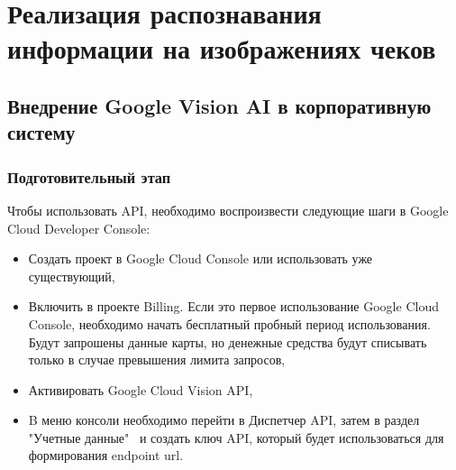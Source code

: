 \documentclass[14pt]{mmcs_article}
\begin{document}

\section{Реализация распознавания информации на изображениях чеков}

\subsection{Внедрение Google Vision AI в корпоративную систему}
\subsubsection{Подготовительный этап}
Чтобы использовать API, необходимо воспроизвести следующие шаги в Google Cloud Developer Console:
\begin{itemize}
\item Создать проект в Google Cloud Console или использовать уже существующий,
\item Включить в проекте Billing. Если это первое использование Google Cloud Console, необходимо начать бесплатный пробный период использования. Будут запрошены данные карты, но денежные средства будут списывать только в случае превышения лимита запросов,
\item Активировать Google Cloud Vision API,
\item B меню консоли необходимо перейти в Диспетчер API, затем в раздел "Учетные данные" \ и создать ключ API, который будет использоваться для формирования endpoint url.
\end{itemize}
\end{document}
